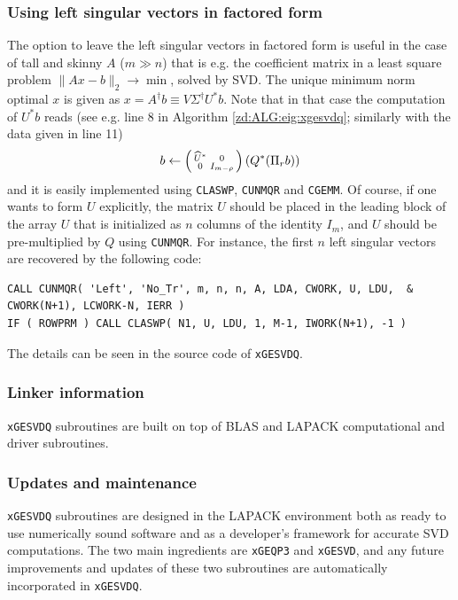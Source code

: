 \documentclass[12pt, a4paper, final]{article}
\numberwithin{equation}{section}
\begin{document}
\subsubsection{Using left singular vectors in factored form}\label{SSS=U=F}
The option to leave the left singular vectors in factored form is useful in the case of tall and skinny $A$ ($m\gg n$) that is e.g. the coefficient matrix in a least square problem $\|Ax-b \|_2\rightarrow\min$, solved by SVD. The unique minimum norm optimal $x$ is given as $x=A^{\dagger}b\equiv V\Sigma^{\dagger}U^* b$. Note that in that case the computation of $U^* b$ reads (see e.g. line 8 in Algorithm \ref{zd:ALG:eig:xgesvdq}; similarly with the data given in line 11)
$$
b \leftarrow  \left( \begin{smallmatrix} \widehat{U}^* & 0 \cr 0 & I_{m-\rho}\end{smallmatrix}\right)( Q^* (\Pi_r b) ) 
$$
and it is easily implemented using \texttt{CLASWP}, \texttt{CUNMQR} and \texttt{CGEMM}. Of course, if one wants to form $U$ explicitly,
the matrix $\widehat{U}$ should be placed in the leading block of the
array $U$ that is initialized as $n$ columns of the identity $I_m$, and $U$ should be pre-multiplied by $Q$ using
\texttt{CUNMQR}. For instance, the first $n$ left singular vectors are recovered by the following code:
\begin{verbatim}
CALL CUNMQR( 'Left', 'No_Tr', m, n, n, A, LDA, CWORK, U, LDU,  &
CWORK(N+1), LCWORK-N, IERR )  
IF ( ROWPRM ) CALL CLASWP( N1, U, LDU, 1, M-1, IWORK(N+1), -1 )
\end{verbatim}
The details can be seen in the source code of \texttt{xGESVDQ}.
\subsubsection{Linker information}
\texttt{xGESVDQ} subroutines are built on top of BLAS and LAPACK computational and driver subroutines. 
\subsubsection{Updates and maintenance}
\texttt{xGESVDQ} subroutines are designed in the LAPACK environment
both as ready to use numerically sound software and as a developer's framework for accurate SVD computations. The two main ingredients are \texttt{xGEQP3} and \texttt{xGESVD}, and any future improvements and updates of these two subroutines are automatically incorporated in \texttt{xGESVDQ}. 
\end{document}
